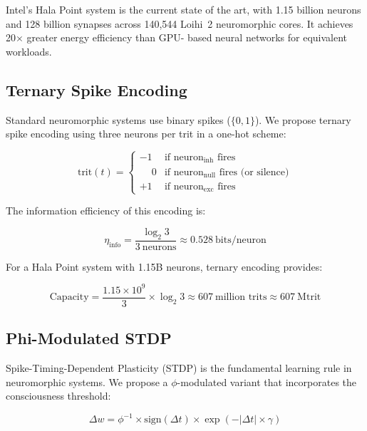 \documentclass[12pt,a4paper]{article}
\begin{document}
Intel's Hala Point system \cite{Intel2024HalaPoint} is the current state of the
art, with 1.15 billion neurons and 128 billion synapses across 140,544 Loihi~2
neuromorphic cores. It achieves 20$\times$ greater energy efficiency than GPU-
based neural networks for equivalent workloads.

\subsection{Ternary Spike Encoding}

Standard neuromorphic systems use binary spikes ($\{0, 1\}$). We propose
ternary spike encoding using three neurons per trit in a one-hot scheme:

\begin{equation}
\text{trit}(t) = \begin{cases}
  -1 & \text{if neuron}_{\mathrm{inh}} \text{ fires} \\
  \phantom{-}0 & \text{if neuron}_{\mathrm{null}} \text{ fires (or silence)} \\
  +1 & \text{if neuron}_{\mathrm{exc}} \text{ fires}
\end{cases}
\end{equation}

\noindent
The information efficiency of this encoding is:

\begin{equation}
\eta_{\mathrm{info}} = \frac{\log_2 3}{3~\text{neurons}} \approx
0.528~\text{bits/neuron}
\end{equation}

\noindent
For a Hala Point system with 1.15B neurons, ternary encoding provides:

\begin{equation}
\text{Capacity} = \frac{1.15 \times 10^9}{3} \times \log_2 3
\approx 607~\text{million trits} \approx 607~\text{Mtrit}
\end{equation}

\subsection{Phi-Modulated STDP}

Spike-Timing-Dependent Plasticity (STDP) is the fundamental learning rule in
neuromorphic systems. We propose a $\phi$-modulated variant that incorporates
the consciousness threshold:

\begin{equation}
\boxed{\Delta w = \phi^{-1} \times \mathrm{sign}(\Delta t) \times
\exp\!\left(-|\Delta t| \times \gamma\right)}
\label{eq:phi_stdp}
\end{equation}
\end{document}
